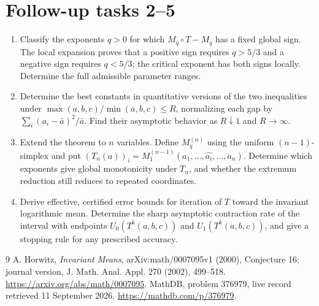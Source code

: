 \documentclass[11pt]{article}
\begin{document}
\section{Follow-up tasks 2--5}
\begin{enumerate}
\renewcommand{\labelenumi}{\textbf{Task \arabic{enumi}.}}
\setcounter{enumi}{1}
\item Classify the exponents $q>0$ for which $M_q\circ T-M_q$ has a fixed
global sign. The local expansion proves that a positive sign requires
$q>5/3$ and a negative sign requires $q<5/3$; the critical exponent has
both signs locally. Determine the full admissible parameter ranges.
\item Determine the best constants in quantitative versions of the two
inequalities under $\max(a,b,c)/\min(a,b,c)\leq R$, normalizing each gap
by $\sum_i(a_i-\bar a)^2/\bar a$. Find their asymptotic behavior as
$R\downarrow1$ and $R\to\infty$.
\item Extend the theorem to $n$ variables. Define $M_q^{(n)}$ using the
uniform $(n-1)$-simplex and put
$(T_n(a))_i=M_1^{(n-1)}(a_1,\ldots,\widehat{a_i},\ldots,a_n)$.
Determine which exponents give global monotonicity under $T_n$, and
whether the extremum reduction still reduces to repeated coordinates.
\item Derive effective, certified error bounds for iteration of $T$ toward
the invariant logarithmic mean. Determine the sharp asymptotic contraction
rate of the interval with endpoints $U_0(T^k(a,b,c))$ and
$U_1(T^k(a,b,c))$, and give a stopping rule for any prescribed accuracy.
\end{enumerate}

\begin{thebibliography}{9}
 A. Horwitz, \emph{Invariant Means}, arXiv:math/0007095v1
(2000), Conjecture 16; journal version, J. Math. Anal. Appl. 270 (2002),
499--518. \url{https://arxiv.org/abs/math/0007095}.
 MathDB, problem 376979, live record retrieved 11 September
2026. \url{https://mathdb.com/p/376979}.
\end{thebibliography}
\end{document}
